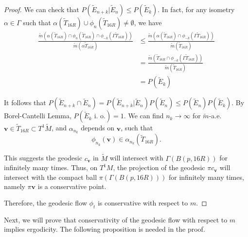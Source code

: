 \documentclass[reqno,11pt]{article}
\theoremstyle{definition}
\theoremstyle{remark}
\numberwithin{equation}{section}
\begin{document}
\begin{proof}
	We can check that $P(\widetilde{E}_{n+k}|\widetilde{E}_n)\leq P(\widetilde{E}_k)$. In fact, for any isometry $\alpha\in\Gamma$ such that $\alpha(\widetilde{T}_{16R})\cup\phi_{n}(\widetilde{T}_{16R})\neq\emptyset$, we have
	\begin{displaymath}
		\begin{aligned}
			\frac{\widetilde{m}(\alpha(\widetilde{T}_{16R})\cap\phi_n(\widetilde{T}_{16R})\cap\phi_{-k}(\Gamma\widetilde{T}_{16R}))}{\widetilde{m}(\alpha\widetilde{T}_{16R})} & \leq\frac{\widetilde{m}(\alpha(\widetilde{T}_{16R})\cap\phi_{-k}(\Gamma\widetilde{T}_{16R}))}{\widetilde{m}(\widetilde{T}_{16R})} \\
			                                                                                                                                                                   & =\frac{\widetilde{m}(\widetilde{T}_{16R}\cap\phi_{-k}(\Gamma\widetilde{T}_{16R}))}{\widetilde{m}(\widetilde{T}_{16R})}            \\
			                                                                                                                                                                   & =P(\widetilde{E}_k)
		\end{aligned}
	\end{displaymath}

	It follows that $P(\widetilde{E}_{n+k}\cap \widetilde{E}_n)=P(\widetilde{E}_{n+k}|\widetilde{E}_n)P(\widetilde{E}_n)\leq P(\widetilde{E}_n)P(\widetilde{E}_k)$. By Borel-Cantelli Lemma, $ P(\widetilde{E}_k\text{ i.\ o.})=1$. We can find $n_k\to\infty$ for $\widetilde{m}$-a.e. $\bm{v}\in\widetilde{T}_{16R}\subset T^1\widetilde{M}$, and $\alpha_{n_k}$ depends on $\bm{v}$, such that
	\begin{displaymath}
		\phi_{n_k}(\bm{v})\in\alpha_{n_k}(\widetilde{T}_{16R}).
	\end{displaymath}

	This suggests the geodesic $c_{\bm{v}}$ in $\widetilde{M}$ will intersect with $\Gamma(B(p,16R))$ for infinitely many times. Thus, on $T^1M$, the projection of the geodesic $\pi c_{\bm{v}}$ will intersect with the compact ball $\pi(\Gamma(B(p,16R)))$ for infinitely many times, namely $\pi\bm{v}$ is a conservative point.

	Therefore, the geodesic flow $\phi_t$ is conservative with respect to $m$.
\end{proof}

Next, we will prove that conservativity of the geodesic flow with respect to $m$ implies ergodicity. The following proposition is needed in the proof.
\end{document}
